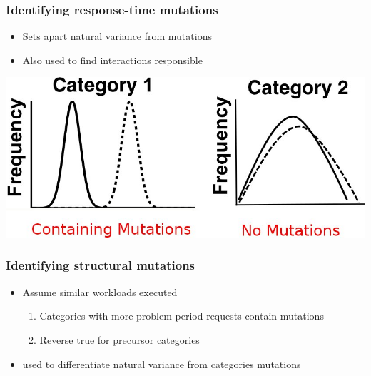 \documentclass[11pt]{beamer}
\begin{document}
\begin{frame}
\frametitle{Identifying response-time mutations}
\begin{itemize}
  \item Sets apart natural variance from mutations
  \item Also used to find interactions responsible
\end{itemize}
\begin{center}
\includegraphics[width=.7\textwidth]{res/mutation1.jpg}
\end{center}
\end{frame}

\begin{frame}
\frametitle{Identifying structural mutations}
\begin{itemize}
  \item Assume similar workloads executed
  \begin{enumerate}
    \item Categories with more problem period requests contain mutations
    \item Reverse true for precursor categories
  \end{enumerate}
  \vskip11pt
  \item {} used to differentiate natural
  variance from categories mutations
\end{itemize}
\end{frame}
\end{document}

